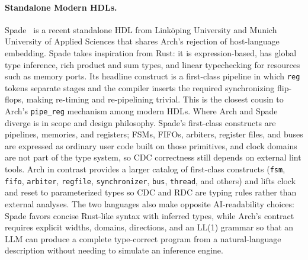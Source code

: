 \documentclass[manuscript]{acmart}
\begin{document}
\paragraph{Standalone Modern HDLs.}
Spade~\cite{spade} is a recent standalone HDL from Linköping University and Munich University of Applied Sciences that shares Arch's rejection of host-language embedding. Spade takes inspiration from Rust: it is expression-based, has global type inference, rich product and sum types, and linear typechecking for resources such as memory ports. Its headline construct is a first-class pipeline in which \texttt{reg} tokens separate stages and the compiler inserts the required synchronizing flip-flops, making re-timing and re-pipelining trivial. This is the closest cousin to Arch's \texttt{pipe\_reg} mechanism among modern HDLs. Where Arch and Spade diverge is in scope and design philosophy. Spade's first-class constructs are pipelines, memories, and registers; FSMs, FIFOs, arbiters, register files, and buses are expressed as ordinary user code built on those primitives, and clock domains are not part of the type system, so CDC correctness still depends on external lint tools. Arch in contrast provides a larger catalog of first-class constructs (\texttt{fsm}, \texttt{fifo}, \texttt{arbiter}, \texttt{regfile}, \texttt{synchronizer}, \texttt{bus}, \texttt{thread}, and others) and lifts clock and reset to parameterized types so CDC and RDC are typing rules rather than external analyses. The two languages also make opposite AI-readability choices: Spade favors concise Rust-like syntax with inferred types, while Arch's contract requires explicit widths, domains, directions, and an LL(1) grammar so that an LLM can produce a complete type-correct program from a natural-language description without needing to simulate an inference engine.
\end{document}
